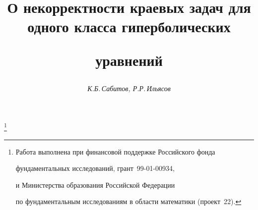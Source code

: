 




%


\newcommand{\sgn}{\operatorname{sgn}}


\newcommand{\tts}[1]{}







\setcounter{page}{59}















\author{\it К.Б.\,Сабитов, Р.Р.\,Ильясов}




\title{О некорректности краевых задач для одного класса гиперболических


уравнений}


\thanks{Работа выполнена при финансовой поддержке Российского фонда


фундаментальных исследований, грант \No\,99-01-00934,


и Министерства образования Российской Федерации 


по фундаментальным исследованиям в области математики (проект \No\,22).}





\date{}




\pagestyle{plain} %







